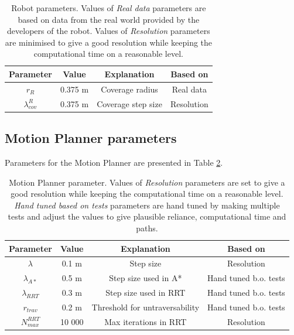 \begin{table}[h!]
    \centering
    \caption{Robot parameters. Values of \emph{Real data} parameters are based on data from the real world provided by the developers of the robot. Values of \emph{Resolution} parameters are minimised to give a good resolution while keeping the computational time on a reasonable level.}
    \begin{tabular}{|c|c|c|c|}
        \hline 
        \textbf{Parameter} & \textbf{Value} & \textbf{Explanation} & \textbf{Based on} \\
        \hline 
        $r_R$ & 0.375 m & Coverage radius & Real data \\
        $\lambda^R_{cov}$ & 0.375 m & Coverage step size & Resolution \\
        \hline 
    \end{tabular}
    
    \label{tab:robot_parameters}
\end{table}

\subsection{Motion Planner parameters}
Parameters for the Motion Planner are presented in Table \ref{tab:mp_parameters}.

\begin{table}[h!]
    \centering
    \caption{Motion Planner parameter. Values of \emph{Resolution} parameters are set to give a good resolution while keeping the computational time on a reasonable level. \emph{Hand tuned based on tests} parameters are hand tuned by making multiple tests and adjust the values to give plausible reliance, computational time and paths.}
    \begin{tabular}{|c|c|c|c|}
        \hline 
        \textbf{Parameter} & \textbf{Value} & \textbf{Explanation} & \textbf{Based on} \\
        \hline 
        $\lambda$ & 0.1 m & Step size & Resolution \\
        $\lambda_{A*}$ & 0.5 m & Step size used in A* & Hand tuned b.o. tests \\
        $\lambda_{RRT}$ & 0.3 m & Step size used in RRT & Hand tuned b.o. tests \\
        $r_{trav}$ & 0.2 m & Threshold for untraversability & Hand tuned b.o. tests \\
        $N^{RRT}_{max}$ & 10 000 & Max iterations in RRT & Resolution \\
        \hline 
    \end{tabular}
    
    \label{tab:mp_parameters}
\end{table}

